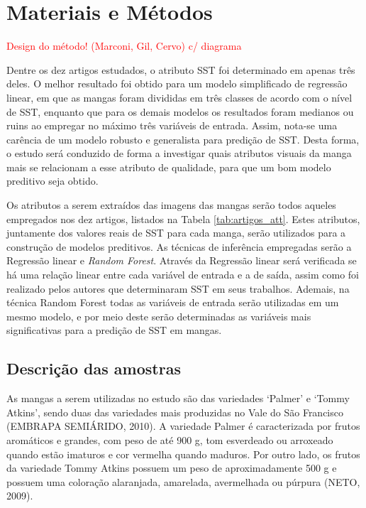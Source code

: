 \chapter{Materiais e Métodos} \label{ch:MM} %

\textcolor{red}{Design do método! (Marconi, Gil, Cervo) c/ diagrama}

Dentre os dez artigos estudados, o atributo SST foi determinado em apenas três deles. O melhor resultado foi obtido para um modelo simplificado de regressão linear, em que as mangas foram divididas em três classes de acordo com o nível de SST, enquanto que para os demais modelos os resultados foram medianos ou ruins ao empregar no máximo três variáveis de entrada. Assim, nota-se uma carência de um modelo robusto e generalista para predição de SST. Desta forma, o estudo será conduzido de forma a investigar quais atributos visuais da manga mais se relacionam a esse atributo de qualidade, para que um bom modelo preditivo seja obtido.

Os atributos a serem extraídos das imagens das mangas serão todos aqueles empregados nos dez artigos, listados na Tabela \ref{tab:artigos_att}. Estes atributos, juntamente dos valores reais de SST para cada manga, serão utilizados para a construção de modelos preditivos. As técnicas de inferência empregadas serão a Regressão linear e \textit{Random Forest}. Através da Regressão linear será verificada se há uma relação linear entre cada variável de entrada e a de saída, assim como foi realizado pelos autores que determinaram SST em seus trabalhos. Ademais, na técnica Random Forest todas as variáveis de entrada serão utilizadas em um mesmo modelo, e por meio deste serão determinadas as variáveis mais significativas para a predição de SST em mangas. 

\section{Descrição das amostras}

As mangas a serem utilizadas no estudo são das variedades ‘Palmer’ e ‘Tommy Atkins’, sendo duas das variedades mais produzidas no Vale do São Francisco (EMBRAPA SEMIÁRIDO, 2010). A variedade Palmer é caracterizada por frutos aromáticos e grandes, com peso de até 900 g, tom esverdeado ou arroxeado quando estão imaturos e cor vermelha quando maduros. Por outro lado, os frutos da variedade Tommy Atkins possuem um peso de aproximadamente 500 g e possuem uma coloração alaranjada, amarelada, avermelhada ou púrpura (NETO, 2009). 

